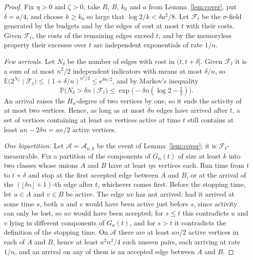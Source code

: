 \documentclass[11pt]{amsart}
\theoremstyle{remark}
\numberwithin{equation}{section}
\newcommand{\E}{\mathbb E}
\newcommand{\Pp}{\mathbb P}
\newcommand{\1}{\mathbf 1}
\begin{document}
\begin{proof}
Fix $\eta>0$ and $\zeta>0$, take $R$, $B$, $k_0$ and $a$ from Lemma~\ref{lem:cover}, put $\delta=a/4$, and choose $k\ge k_0$ so large that $\log2/k<\delta a^2/8$. Let $\mathcal F_t$ be the $\sigma$-field generated by the budgets and by the edges of cost at most $t$ with their costs. Given $\mathcal F_t$, the costs of the remaining edges exceed $t$, and by the memoryless property their excesses over $t$ are independent exponentials of rate $1/n$.

\emph{Few arrivals.} Let $N_\delta$ be the number of edges with cost in $(t,t+\delta]$. Given $\mathcal F_t$ it is a sum of at most $n^2/2$ independent indicators with means at most $\delta/n$, so $\E\bigl(2^{N_\delta}\mid\mathcal F_t\bigr)\le(1+\delta/n)^{n^2/2}\le e^{\delta n/2}$, and by Markov's inequality
\[
\Pp\bigl(N_\delta>\delta n\mid\mathcal F_t\bigr)\le\exp\bigl(-\delta n(\log2-\tfrac12)\bigr).
\]
An arrival raises the $H_n$-degree of two vertices by one, so it ends the activity of at most two vertices. Hence, as long as at most $\delta n$ edges have arrived after $t$, a set of vertices containing at least $an$ vertices active at time $t$ still contains at least $an-2\delta n=an/2$ active vertices.

\emph{One bipartition.} Let $\mathcal A=\mathcal A_{n,k}$ be the event of Lemma~\ref{lem:cover}; it is $\mathcal F_t$-measurable. Fix a partition of the components of $G_n(t)$ of size at least $k$ into two classes whose unions $A$ and $B$ have at least $\eta n$ vertices each. Run time from $t$ to $t+\delta$ and stop at the first accepted edge between $A$ and $B$, or at the arrival of the $(\lfloor\delta n\rfloor+1)$-th edge after $t$, whichever comes first. Before the stopping time, let $u\in A$ and $v\in B$ be active. The edge $uv$ has not arrived: had it arrived at some time $s$, both $u$ and $v$ would have been active just before $s$, since activity can only be lost, so $uv$ would have been accepted; for $s\le t$ this contradicts $u$ and $v$ lying in different components of $G_n(t)$, and for $s>t$ it contradicts the definition of the stopping time. On $\mathcal A$ there are at least $an/2$ active vertices in each of $A$ and $B$, hence at least $a^2n^2/4$ such unseen pairs, each arriving at rate $1/n$, and an arrival on any of them is an accepted edge between $A$ and $B$.


\end{proof}
\end{document}
